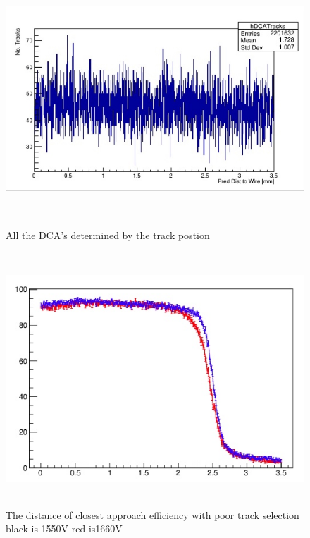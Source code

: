\documentclass[./Thesis]{subfiles}
\begin{document}
\begin{figure}
	\centerline{\includegraphics[height=95mm]{DCATracks.jpeg}}
	\caption[DCA Tracks]{ All the DCA's determined by the track postion}
	\label{fig:dcaTracks}
\end{figure} 

\begin{figure}
	\centerline{\includegraphics[height=95mm]{BadDCAEff.jpeg}}
	\caption[BadDCAEfficiency]{ The distance of closest approach efficiency with poor track selection black is 1550V red is1660V}
	\label{fig:badDCAeff}
\end{figure} 	
\end{document}
